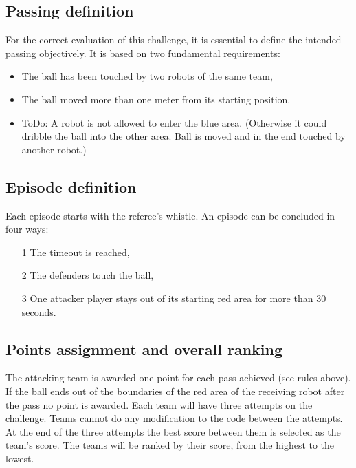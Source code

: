 \subsection{Passing definition}
For the correct evaluation of this challenge, it is essential to define the intended passing objectively. It is based on two fundamental requirements:
\begin{itemize}
    \item The ball has been touched by two robots of the same team,
    \item The ball moved more than one meter from its starting position.
    \item ToDo: A robot is not allowed to enter the blue area. (Otherwise it could dribble the ball into the other area. Ball is moved and in the end touched by another robot.)
\end{itemize}


\subsection{Episode definition}
Each episode starts with the referee's whistle. An episode can be concluded in four ways: 
\begin{itemize}
    \item[1] The timeout is reached,
    \item[2] The defenders touch the ball,
    \item[3] One attacker player stays out of its starting red area for more than 30 seconds.

\end{itemize}

\subsection{Points assignment and overall ranking}
The attacking team is awarded one point for each pass achieved (see rules above). If the ball ends out of the boundaries of the red area of the receiving robot after the pass no point is awarded. Each team will have three attempts on the challenge. Teams cannot do any modification to the code between the attempts. At the end of the three attempts the best score between them is selected as the team's score. The teams will be ranked by their score, from the highest to the lowest. 

